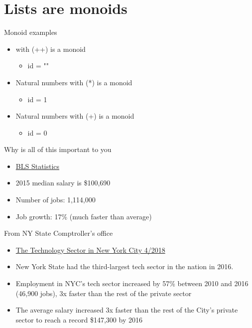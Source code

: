 \documentclass[presetation]{beamer}
\begin{document}
\section{Lists are monoids}
\label{sec:org86c4e64}
\begin{frame}[label={sec:orga3c4640}]{Monoid examples}
\begin{example}
\begin{itemize}
\item\relax [] with (++) is a monoid
\begin{itemize}
\item id = ""
\end{itemize}
\item Natural numbers with (*) is a monoid
\begin{itemize}
\item id = 1
\end{itemize}
\item Natural numbers with (+) is a monoid
\begin{itemize}
\item id = 0
\end{itemize}
\end{itemize}
\end{example}
\end{frame}


\begin{frame}[label={sec:orgca74cc7}]{Why is all of this important to you}
\begin{itemize}
\item \href{https://www.bls.gov/ooh/computer-and-information-technology/mobile/software-developers.htm}{BLS Statistics}
\item 2015 median salary is \$100,690
\item Number of jobs: 1,114,000
\item Job growth: 17\% (much faster than average)
\end{itemize}
\end{frame}

\begin{frame}[label={sec:org7743feb}]{From NY State Comptroller's office}
\begin{itemize}
\item \href{https://www.bls.gov/ooh/computer-and-information-technology/mobile/software-developers.htm}{The Technology Sector in New York City 4/2018}
\item New York State had the third-largest tech sector in the nation
in 2016.
\item Employment in NYC’s tech sector increased by 57\% between 2010 and
2016 (46,900 jobs), 3x faster than the rest of the private sector
\item The average salary increased 3x faster than the rest of the City’s
private sector to reach a record \$147,300 by 2016
\end{itemize}
\end{frame}
\end{document}
